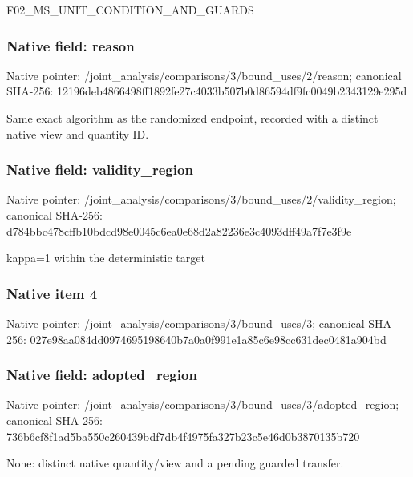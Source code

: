 \documentclass[10pt,a4paper]{article}
\begin{document}
\begingroup\raggedright\sloppy F02\_\allowbreak{}MS\_\allowbreak{}UNIT\_\allowbreak{}CONDITION\_\allowbreak{}AND\_\allowbreak{}GUARDS\par\endgroup

\subsubsection{Native field: reason}
Native pointer: /joint\_\allowbreak{}analysis/comparisons/3/bound\_\allowbreak{}uses/2/reason; canonical SHA-256: 12196deb4866498ff1892fe27c4033b507b0d86594df9fc0049b2343129e295d

\begingroup\raggedright\sloppy Same exact algorithm as the randomized endpoint,\allowbreak{} recorded with a distinct native view and quantity ID.\par\endgroup

\subsubsection{Native field: validity\_\allowbreak{}region}
Native pointer: /joint\_\allowbreak{}analysis/comparisons/3/bound\_\allowbreak{}uses/2/validity\_\allowbreak{}region; canonical SHA-256: d784bbc478cffb10bdcd98e0045c6ea0e68d2a82236e3c4093dff49a7f7e3f9e

\begingroup\raggedright\sloppy kappa=\allowbreak{}1 within the deterministic target\par\endgroup

\subsubsection{Native item 4}
Native pointer: /joint\_\allowbreak{}analysis/comparisons/3/bound\_\allowbreak{}uses/3; canonical SHA-256: 027e98aa084dd0974695198640b7a0a0f991e1a85c6e98cc631dec0481a904bd

\subsubsection{Native field: adopted\_\allowbreak{}region}
Native pointer: /joint\_\allowbreak{}analysis/comparisons/3/bound\_\allowbreak{}uses/3/adopted\_\allowbreak{}region; canonical SHA-256: 736b6cf8f1ad5ba550c260439bdf7db4f4975fa327b23c5e46d0b3870135b720

\begingroup\raggedright\sloppy None:\allowbreak{} distinct native quantity/\allowbreak{}view and a pending guarded transfer.\par\endgroup
\end{document}
